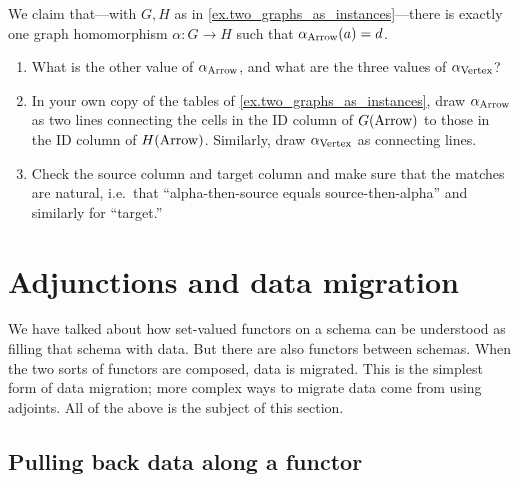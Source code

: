 \documentclass[7Sketches]{subfiles}
\begin{document}
\begin{exercise}%
%
\label{exc.unique_alpha}
We claim that---with $G,H$ as in \cref{ex.two_graphs_as_instances}---there is exactly one graph homomorphism $\alpha\colon G\to H$ such that $\alpha_{\mathrm{Arrow}}(a)=d$.
\begin{enumerate}
	\item What is the other value of $\alpha_{\mathrm{Arrow}}$, and what are the three values of $\alpha_{\mathrm{Vertex}}$?
	\item In your own copy of the tables of \cref{ex.two_graphs_as_instances}, draw $\alpha_{\mathrm{Arrow}}$ as two lines connecting the cells in the ID column of $G(\mathrm{Arrow})$ to those in the ID column of $H(\mathrm{Arrow})$. Similarly, draw $\alpha_{\mathrm{Vertex}}$ as connecting lines.
	\item Check the source column and target column and make sure that the matches are natural, i.e.\ that ``alpha-then-source equals source-then-alpha'' and similarly for ``target.''
\qedhere
\end{enumerate}
\end{exercise}




\section{Adjunctions and data migration}%
\label{sec.adjunctions_mig}%
%
%

We have talked about how set-valued functors on a schema can be understood as filling that schema with data. But there are also functors between schemas. When the two sorts of functors are composed, data is migrated. This is the simplest form of data migration; more complex ways to migrate data come from using adjoints. All of the above is the subject of this section.

\subsection{Pulling back data along a functor}%
\label{subsec.pullback_data}
%
\end{document}
